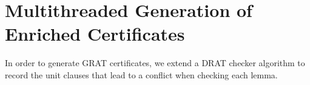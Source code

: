 \documentclass{llncs}
\begin{document}
%     
%   
%   
%       
%       
%     
%     
    
\section{Multithreaded Generation of Enriched Certificates}\label{sec:gratgen}
In order to generate GRAT certificates, we extend a DRAT checker algorithm 
to record the unit clauses that lead to a conflict when checking each lemma. 
\end{document}
